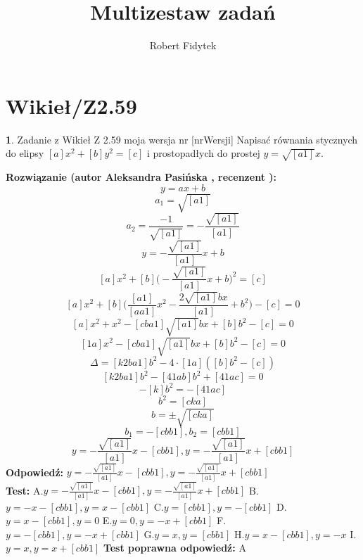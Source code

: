 \documentclass[12pt, a4paper]{article}
\title{Multizestaw zadań}
\author{Robert Fidytek}
\date{}
\theoremstyle{definition} %
\newtheorem{zad}{}
\newcommand{\kategoria}[1]{\section{#1}} %
\newcommand{\zadStart}[1]{\begin{zad}#1\newline} %
\newcommand{\zadStop}{\end{zad}}   %
\newcommand{\rozwStart}[2]{\noindent \textbf{Rozwiązanie (autor #1 , recenzent #2): }\newline} %
\newcommand{\rozwStop}{\newline}                                            %
\newcommand{\odpStart}{\noindent \textbf{Odpowiedź:}\newline}    %
\newcommand{\odpStop}{\newline}                                             %
\newcommand{\testStart}{\noindent \textbf{Test:}\newline} %
\newcommand{\testStop}{\newline} %
\newcommand{\kluczStart}{\noindent \textbf{Test poprawna odpowiedź:}\newline} %
\newcommand{\kluczStop}{\newline} %
\begin{document}
\maketitle


\kategoria{Wikieł/Z2.59}
\zadStart{Zadanie z Wikieł Z 2.59 moja wersja nr [nrWersji]}
Napisać równania stycznych do elipsy $[a]x^2+[b]y^2=[c]$ i prostopadłych do prostej $y=\sqrt{[a1]}x$.
\zadStop
\rozwStart{Aleksandra Pasińska}{}
$$y=ax+b$$
$$a_1=\sqrt{[a1]}$$
$$a_2=\frac{-1}{\sqrt{[a1]}}=-\frac{\sqrt{[a1]}}{[a1]}$$
$$y=-\frac{\sqrt{[a1]}}{[a1]}x+b$$
$$[a]x^2+[b]\bigg(-\frac{\sqrt{[a1]}}{[a1]}x+b\bigg)^2=[c]$$
$$[a]x^2+[b]\bigg(\frac{[a1]}{[aa1]}x^2-\frac{2\sqrt{[a1]}bx}{[a1]}+b^2\bigg)-[c]=0$$
$$[a]x^2+x^2-[cba1]\sqrt{[a1]}bx+[b]b^2-[c]=0$$
$$[1a]x^2-[cba1]\sqrt{[a1]}bx+[b]b^2-[c]=0$$
$$\Delta=[k2ba1]b^2-4\cdot[1a]([b]b^2-[c])$$
$$[k2ba1]b^2-[41ab]b^2+[41ac]=0$$
$$-[k]b^2=-[41ac]$$
$$b^2=[cka]$$
$$b=\pm \sqrt{[cka]}$$
$$b_1=-[cbb1],b_2=[cbb1]$$
$$ y=-\frac{\sqrt{[a1]}}{[a1]}x-[cbb1], y=-\frac{\sqrt{[a1]}}{[a1]}x+[cbb1]$$
\rozwStop
\odpStart
$ y=-\frac{\sqrt{[a1]}}{[a1]}x-[cbb1], y=-\frac{\sqrt{[a1]}}{[a1]}x+[cbb1]$\\
\odpStop
\testStart
A.$ y=-\frac{\sqrt{[a1]}}{[a1]}x-[cbb1], y=-\frac{\sqrt{[a1]}}{[a1]}x+[cbb1]$
B.$ y=-x-[cbb1], y=x-[cbb1]$
C.$ y=[cbb1], y=-[cbb1]$
D.$ y=x-[cbb1], y=0$
E.$ y=0, y=-x+[cbb1]$
F.$ y=-[cbb1], y=-x+[cbb1]$
G.$ y=x, y=[cbb1]$
H.$ y=x-[cbb1], y=-x$
I.$ y=x, y=x+[cbb1]$
\testStop
\kluczStart
A
\kluczStop
\end{document}
